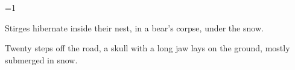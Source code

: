 
\ifnum\value{cycle}=1

  Stirges hibernate inside their nest, in a bear's corpse, under the \gls{snow}.

  \begin{boxtext}
    Twenty \glspl{step} off the road, a skull with a long jaw lays on the ground, mostly submerged in \gls{snow}.
  \end{boxtext}
  \label{\jobname:harvestStirge}

\fi



